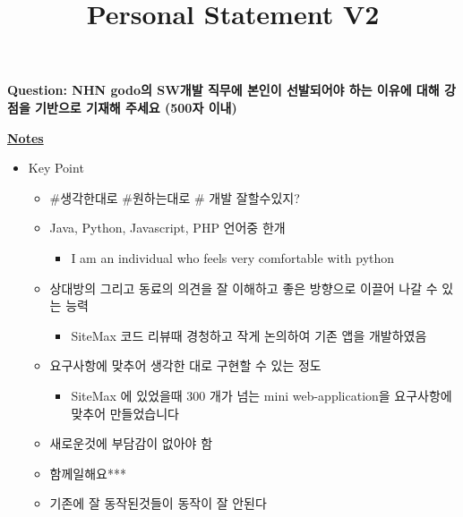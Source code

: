 \documentclass[12pt]{article}
\begin{document}
\title{Personal Statement V2}
\maketitle

\textbf{Question: NHN godo의 SW개발 직무에 본인이 선발되어야 하는 이유에 대해 강점을 기반으로 기재해 주세요 (500자 이내)}

\bigskip

\underline{\textbf{Notes}}

\begin{itemize}
    \item Key Point
    \begin{itemize}
        \item \#생각한대로 \#원하는대로 \# 개발 잘할수있지?
        \item Java, Python, Javascript, PHP 언어중 한개
        \begin{itemize}
            \item I am an individual who feels very comfortable with python
        \end{itemize}
        \item 상대방의 그리고 동료의 의견을 잘 이해하고 좋은 방향으로 이끌어 나갈 수 있는 능력
        \begin{itemize}
            \item SiteMax 코드 리뷰때 경청하고 작게 논의하여 기존 앱을 개발하였음
        \end{itemize}
        \item 요구사항에 맞추어 생각한 대로 구현할 수 있는 정도
        \begin{itemize}
            \item SiteMax 에 있었을때 300 개가 넘는 mini web-application을 요구사항에 맞추어 만들었습니다
        \end{itemize}
        \item 새로운것에 부담감이 없아야 함
        \item 함께일해요***
        \item 기존에 잘 동작된것들이 동작이 잘 안된다
    \end{itemize}
\end{itemize}
\end{document}
